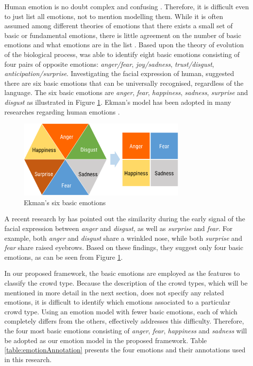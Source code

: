 Human emotion is no doubt complex and confusing \citep{plutchik2001nature}. Therefore, it is difficult even to just list all emotions, not to mention modelling them. While it is often assumed among different theories of emotions that there exists a small set of basic or fundamental emotions, there is little agreement on the number of basic emotions and what emotions are in the list \citep{Ortony1990}. Based upon the theory of evolution of the biological process, \citet{plutchik2001integration} was able to identify eight basic emotions consisting of four pairs of opposite emotions: \textit{anger/fear}, \textit{joy/sadness}, \textit{trust/disgust}, \textit{anticipation/surprise}. Investigating the facial expression of human, \citet{ekman1971constants} suggested there are six basic emotions that can be universally recognised, regardless of the language. The six basic emotions are \textit{anger}, \textit{fear}, \textit{happiness}, \textit{sadness}, \textit{surprise} and \textit{disgust} as illustrated in Figure \ref{fig:emotionModel}. Ekman's model has been adopted in many researches regarding human emotions \citep{mohammad2014using, roberts2012empatweet, alm2005emotions}. 

\begin{figure}[htb!]
\centering    
\includegraphics[width=0.75\textwidth]{EkmanModel}
\caption{Ekman's six basic emotions}
\label{fig:emotionModel}
\end{figure}

A recent research by \cite{Jack2014} has pointed out the similarity during the early signal of the facial expression between \textit{anger} and \textit{disgust}, as well as \textit{surprise} and \textit{fear}. For example, both \textit{anger} and \textit{disgust} share a wrinkled nose, while both \textit{surprise} and \textit{fear} share raised eyebrows. Based on these findings, they suggest only four basic emotions, as can be seen from Figure \ref{fig:emotionModel}.

In our proposed framework, the basic emotions are employed as the features to classify the crowd type. Because the description of the crowd types, which will be mentioned in more detail in the next section, does not specify any related emotions, it is difficult to identify which emotions associated to a particular crowd type. Using an emotion model with fewer basic emotions, each of which completely differs from the others, effectively addresses this difficulty. Therefore, the four most basic emotions consisting of \textit{anger}, \textit{fear}, \textit{happiness} and \textit{sadness} will be adopted as our emotion model in the proposed framework. Table \ref{table:emotionAnnotation} presents the four emotions and their annotations used in this research.


